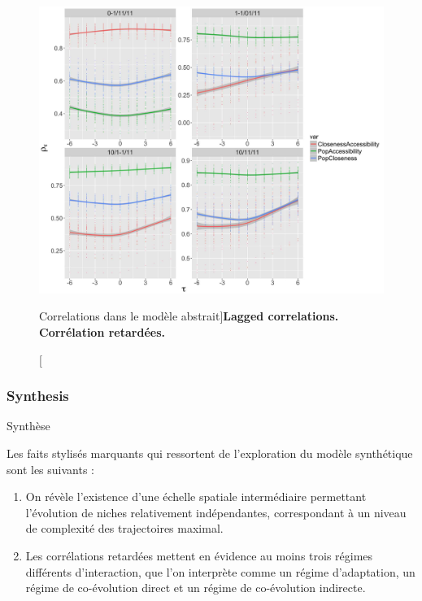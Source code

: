\begin{figure}
	\includegraphics[width=\linewidth]{Figures/Final/6-2-2-fig-macrocoevol-correlations.jpg}
\caption[Correlations in the abstract model][Correlations dans le modèle abstrait]{\textbf{Lagged correlations.} \label{fig:macrocoevol:correlations}}{\textbf{Corrélation retardées.} \label{fig:macrocoevol:correlations}}
\end{figure}








\subsubsection{Synthesis}{Synthèse}

Les faits stylisés marquants qui ressortent de l'exploration du modèle synthétique sont les suivants :

\begin{enumerate}
	\item On révèle l'existence d'une échelle spatiale intermédiaire permettant l'évolution de niches relativement indépendantes, correspondant à un niveau de complexité des trajectoires maximal.
	\item Les corrélations retardées mettent en évidence au moins trois régimes différents d'interaction, que l'on interprète comme un régime d'adaptation, un régime de co-évolution direct et un régime de co-évolution indirecte.
\end{enumerate}




